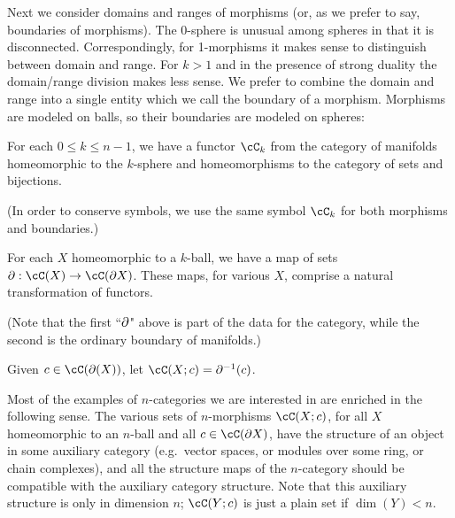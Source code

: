 Next we consider domains and ranges of morphisms (or, as we prefer to say, boundaries
of morphisms).
The 0-sphere is unusual among spheres in that it is disconnected.
Correspondingly, for 1-morphisms it makes sense to distinguish between domain and range.
For $k>1$ and in the presence of strong duality the domain/range division makes less sense.
We prefer to combine the domain and range into a single entity which we call the 
boundary of a morphism.
Morphisms are modeled on balls, so their boundaries are modeled on spheres:

{For each $0 \le k \le n-1$, we have a functor $\cC_k$ from 
the category of manifolds homeomorphic to the $k$-sphere and 
homeomorphisms to the category of sets and bijections.}

(In order to conserve symbols, we use the same symbol $\cC_k$ for both morphisms and boundaries.)

{For each $X$ homeomorphic to a $k$-ball, we have a map of sets $\bd: \cC(X)\to \cC(\bd X)$.
These maps, for various $X$, comprise a natural transformation of functors.}

(Note that the first ``$\partial$" above is part of the data for the category, 
while the second is the ordinary boundary of manifolds.)

Given $c\in\cC(\bd(X))$, let $\cC(X; c) = \bd^{-1}(c)$.

Most of the examples of $n$-categories we are interested in are enriched in the following sense.
The various sets of $n$-morphisms $\cC(X; c)$, for all $X$ homeomorphic to an $n$-ball and
all $c\in \cC(\bd X)$, have the structure of an object in some auxiliary category
(e.g.\ vector spaces, or modules over some ring, or chain complexes),
and all the structure maps of the $n$-category should be compatible with the auxiliary
category structure.
Note that this auxiliary structure is only in dimension $n$;
$\cC(Y; c)$ is just a plain set if $\dim(Y) < n$.

\medskip
{}
\medskip

